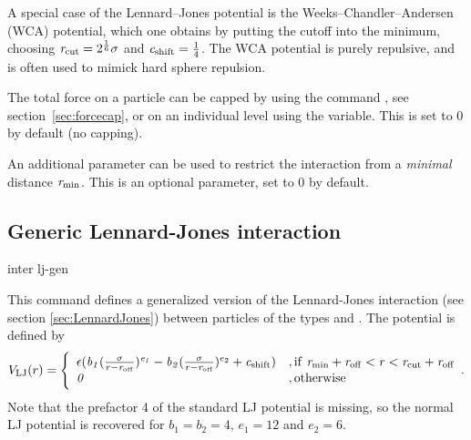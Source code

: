 A special case of the Lennard--Jones potential is the
Weeks--Chandler--Andersen (WCA) potential, which one obtains by
putting the cutoff into the minimum, \ie choosing
$\mathrm{\mathit{r_\mathrm{cut}}}=2^\frac{1}{6}\mathrm{\mathit{\sigma}}$ and
$\mathrm{\mathit{c_\mathrm{shift}}}=\frac{1}{4}$. The WCA potential is purely
repulsive, and is often used to mimick hard sphere repulsion.

The total force on a particle can be capped by using the command
, see section~\ref{sec:forcecap}, or on an
individual level using the  variable. This is set
to 0 by default (no capping).

An additional parameter can be used to restrict the interaction from a
\emph{minimal} distance $\mathrm{\mathit{r_\mathrm{min}}}$. This is an optional
parameter, set to 0 by default.

\subsection{Generic Lennard-Jones interaction}

\begin{essyntax}
  inter  
  lj-gen
  \var{\epsilon} \var{\sigma} 
    
     
  \begin{features}
  \end{features}
\end{essyntax}

This command defines a generalized version of the Lennard-Jones
interaction (see section \ref{sec:LennardJones}) between particles of
the types  and .  The potential is defined by
\begin{equation}
  \label{eq:lj}
  V_\mathrm{LJ}(r) = \Biggl\{
    \begin{array}{ll}
      \epsilon(\mathrm{\mathit{b_1}}(\frac{\mathrm{\mathit{\sigma}}}{r-\mathrm{\mathit{r_\mathrm{off}}}})^{\mathrm{\mathit{e_1}}}
      -\mathrm{\mathit{b_2}}(\frac{\mathrm{\mathit{\sigma}}}{r-\mathrm{\mathit{r_\mathrm{off}}}})^{e_2}+\mathrm{\mathit{c_\mathrm{shift}}}) 
      & \mathrm{, if~} \mathrm{\mathit{r_\mathrm{min}}}+\mathrm{\mathit{r_\mathrm{off}}} < \mathrm{\mathit{r}} < \mathrm{\mathit{r_\mathrm{cut}}}+\mathrm{\mathit{r_\mathrm{off}}}\\
      \mathit{0} 
      & \mathrm{, otherwise}\\
    \end{array}.
\end{equation}
Note that the prefactor 4 of the standard LJ potential is missing, so the normal
LJ potential is recovered for $b_1=b_2=4$, $e_1=12$ and $e_2=6$.

